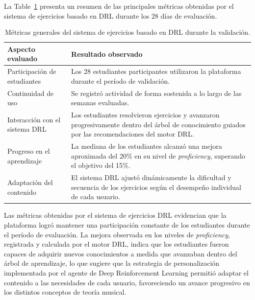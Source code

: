La Table~\ref{tab:resultados_ieee} presenta un resumen de las principales métricas obtenidas por el sistema de ejercicios basado en DRL durante los 28 días de evaluación.

\begin{table}[H]
    \centering
    \caption{Métricas generales del sistema de ejercicios basado en DRL durante la validación.}
    \label{tab:resultados_ieee}
    \begin{tabular}{|p{3.0cm}|p{4.5cm}|}
        \hline
        \textbf{Aspecto evaluado} & \textbf{Resultado observado} \\
        \hline
        Participación de estudiantes & Los 28 estudiantes participantes utilizaron la plataforma durante el período de validación. \\
        \hline
        Continuidad de uso & Se registró actividad de forma sostenida a lo largo de las semanas evaluadas. \\
        \hline
        Interacción con el sistema DRL & Los estudiantes resolvieron ejercicios y avanzaron progresivamente dentro del árbol de conocimiento guiados por las recomendaciones del motor DRL. \\
        \hline
        Progreso en el aprendizaje & La mediana de los estudiantes alcanzó una mejora aproximada del 20\% en su nivel de \textit{proficiency}, superando el objetivo del 15\%. \\
        \hline
        Adaptación del contenido & El sistema DRL ajustó dinámicamente la dificultad y secuencia de los ejercicios según el desempeño individual de cada usuario. \\
        \hline
    \end{tabular}
\end{table}

Las métricas obtenidas por el sistema de ejercicios DRL evidencian que la plataforma logró mantener una participación constante de los estudiantes durante el período de evaluación. La mejora observada en los niveles de \textit{proficiency}, registrada y calculada por el motor DRL, indica que los estudiantes fueron capaces de adquirir nuevos conocimientos a medida que avanzaban dentro del árbol de aprendizaje, lo que sugiere que la estrategia de personalización implementada por el agente de Deep Reinforcement Learning permitió adaptar el contenido a las necesidades de cada usuario, favoreciendo un avance progresivo en los distintos conceptos de teoría musical.